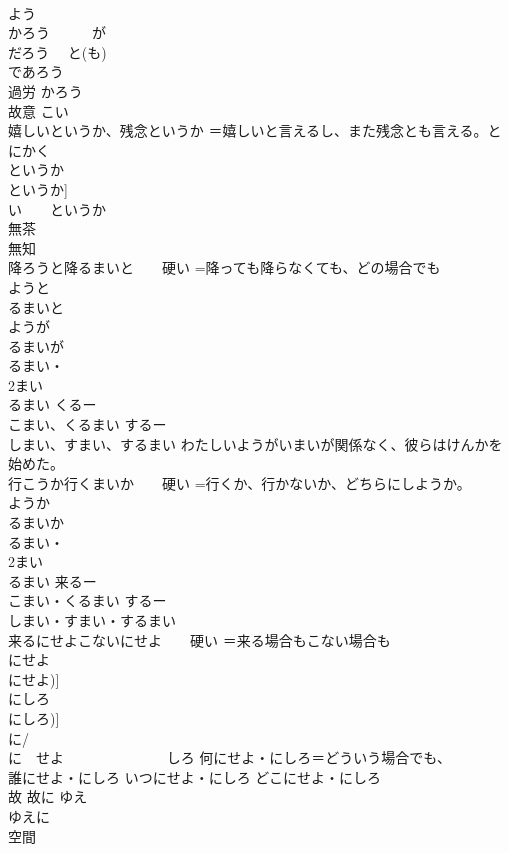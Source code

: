 \documentclass[8pt]{extreport}
\begin{document}
\begin{CJK}{UTF8}{min}
\\	よう 　　　　　　
\\	かろう　　　が 
\\	だろう 　と(も) 
\\	であろう
\\	過労	かろう 
\\	故意	こい 
\\	嬉しいというか、残念というか	＝嬉しいと言えるし、また残念とも言える。とにかく 
\\	というか
\\	というか] 
\\	い　　というか 
\\	無茶	
\\	無知	
\\	降ろうと降るまいと　　硬い	=降っても降らなくても、どの場合でも 
\\	ようと
\\	るまいと 
\\	ようが
\\	るまいが 
\\	るまい・
\\	2まい 
\\	るまい くるー
\\	こまい、くるまい するー
\\	しまい、すまい、するまい わたしいようがいまいが関係なく、彼らはけんかを始めた。
\\	行こうか行くまいか　　硬い	=行くか、行かないか、どちらにしようか。 
\\	ようか
\\	るまいか 
\\	るまい・
\\	2まい 
\\	るまい 来るー
\\	こまい・くるまい するー
\\	しまい・すまい・するまい
\\	来るにせよこないにせよ　　硬い	＝来る場合もこない場合も 
\\	にせよ
\\	にせよ)] 
\\	にしろ
\\	にしろ)] 
\\	に/
\\	に　せよ 　　　　　　　しろ 何にせよ・にしろ＝どういう場合でも、
\\	誰にせよ・にしろ いつにせよ・にしろ どこにせよ・にしろ
\\	故 故に	ゆえ
\\	ゆえに
\\	空間	

\end{CJK}
\end{document}
